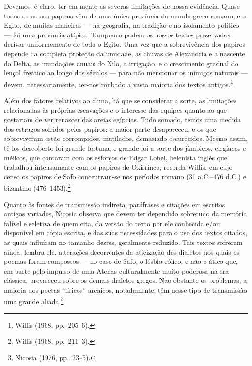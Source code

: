 \begin{hedraquote}
Devemos, é claro, ter em mente as severas limitações de nossa evidência. Quase
todos os nossos papiros vêm de uma única província do mundo greco-romano; e o
Egito, de muitas maneiras --- na geografia, na tradição e no isolamento político
--- foi uma província atípica. Tampouco podem os nossos textos preservados
derivar uniformemente de todo o Egito. Uma vez que a sobrevivência dos papiros
depende da completa proteção da umidade, as chuvas de Alexandria e a nascente
do Delta, as inundações anuais do Nilo, a irrigação, e o crescimento gradual do
lençol freático ao longo dos séculos --- para não mencionar os inimigos naturais
--- devem, necessariamente, ter-nos roubado a vasta maioria dos textos antigos.\footnote{ Willis (1968, pp.~205--6).}
\end{hedraquote}

Além dos fatores relativos ao clima, há que se considerar a sorte, as limitações
relacionadas às próprias escavações e o interesse das equipes quanto ao que
gostariam de ver renascer das areias egípcias. Tudo somado, temos uma medida
dos estragos sofridos pelos papiros: a maior parte desapareceu, e os que
sobreviveram estão corrompidos, mutilados, demasiado escurecidos. Mesmo assim,
tê-los descoberto foi grande fortuna; e grande foi a sorte dos jâmbicos,
elegíacos e mélicos, que contaram com os esforços de Edgar Lobel, helenista
inglês que trabalhou intensamente com os papiros de Oxirrinco, recorda Willis,
em cujo censo os papiros de Safo concentram-se nos períodos
romano (31 a.C.--476 d.C.) e bizantino (476--1453).\footnote{ Willis (1968, pp.~211--3).}

Quanto às fontes de transmissão indireta, paráfrases e citações em escritos
antigos variados, Nicosia observa que devem ter dependido
sobretudo da memória falível e seletiva de quem cita, da versão do texto por
ele conhecida e/ou disponível em cópia escrita, e das suas necessidades para o
uso dos textos citados, as quais influíram no tamanho destes, geralmente
reduzido. Tais textos sofreram ainda, lembra ele, alterações decorrentes da
aticização dos dialetos nos quais os poemas foram compostos --- no caso de Safo,
o lésbio-eólico, e não o ático que, em parte pelo impulso de uma Atenas
culturalmente muito poderosa na era clássica, prevaleceu sobre os demais
dialetos gregos. Não obstante os problemas, a maioria dos poetas “líricos”
arcaicos, notadamente, têm nesse tipo de transmissão uma grande aliada.\footnote{ Nicosia (1976, pp.~23--5).}

